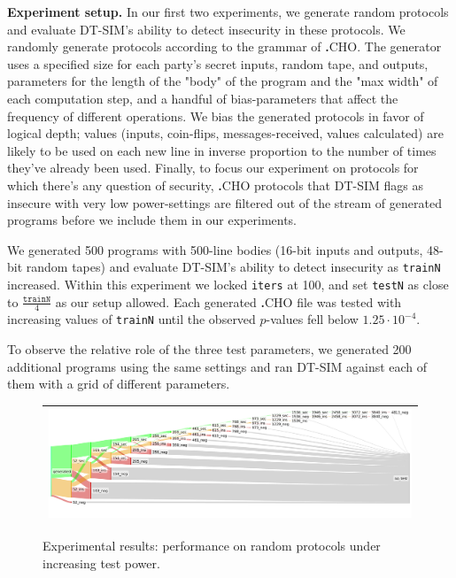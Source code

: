 \documentclass[compsoc, conference, a4paper, 10pt, times]{IEEEtran}
\renewcommand{\paragraph}[1]{\vspace*{2pt}\noindent\textbf{#1}}
\newcommand{\langname}{\textsc{\textbf{.}CHO}\xspace}
\newcommand{\toolname}{\textsc{DT-SIM}\xspace}
\begin{document}
\paragraph{Experiment setup.}
In our first two experiments, we generate random protocols and evaluate \toolname's ability to detect insecurity in these protocols.
We randomly generate protocols according to the grammar of \langname.
The generator uses a specified size for each party's secret inputs, random tape, and outputs,
parameters for the length of the "body" of the program and the "max width" of each computation step,
and a handful of bias-parameters that affect the frequency of different operations.
We bias the generated protocols in favor of logical depth;
values (inputs, coin-flips, messages-received, values calculated) are likely
to be used on each new line in inverse proportion to the number of times they've already been used.
Finally, to focus our experiment on protocols for which there's any question of security,
\langname protocols that \toolname flags as insecure with very low power-settings
are filtered out of the stream of generated programs before we include them in our experiments.

We generated 500 programs with 500-line bodies (16-bit inputs and outputs, 48-bit random tapes)
and evaluate \toolname's ability to detect insecurity as \texttt{trainN} increased.
Within this experiment we locked \texttt{iters} at 100, and set \texttt{testN} as close to $\frac{\mathtt{trainN}}{4}$ as our setup allowed.
Each generated \langname file was tested with increasing values of \texttt{trainN} until the observed $p$-values fell below $1.25 \cdot 10^{-4}$.

To observe the relative role of the three test parameters, we generated 200 additional programs using the same settings
and ran \toolname against each of them with a grid of different parameters.


\begin{figure}
  \label{fig:sankey}
  \centering
  \newcommand{\gsize}{.9\textwidth}
\begin{tabular}{c}
    \hline\hline
    \includegraphics[width=\gsize]{graphs/medium2.old.pdf} \\
    \hline
    \hline
\end{tabular}
\caption{Experimental results: performance on random protocols under increasing test power.}
\end{figure}
\end{document}
